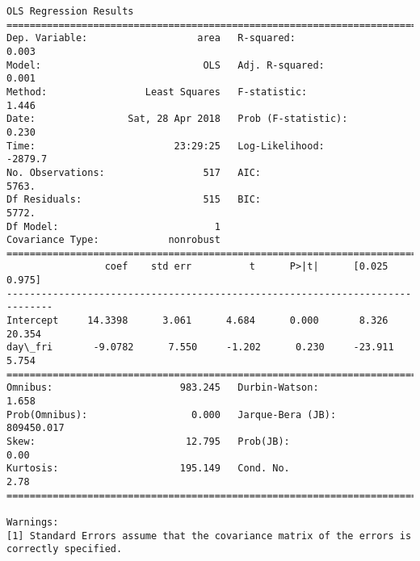 \documentclass[11pt]{article}
\begin{document}
\begin{Verbatim}[commandchars=\\\{\}]
                            OLS Regression Results                            
==============================================================================
Dep. Variable:                   area   R-squared:                       0.003
Model:                            OLS   Adj. R-squared:                  0.001
Method:                 Least Squares   F-statistic:                     1.446
Date:                Sat, 28 Apr 2018   Prob (F-statistic):              0.230
Time:                        23:29:25   Log-Likelihood:                -2879.7
No. Observations:                 517   AIC:                             5763.
Df Residuals:                     515   BIC:                             5772.
Df Model:                           1                                         
Covariance Type:            nonrobust                                         
==============================================================================
                 coef    std err          t      P>|t|      [0.025      0.975]
------------------------------------------------------------------------------
Intercept     14.3398      3.061      4.684      0.000       8.326      20.354
day\_fri       -9.0782      7.550     -1.202      0.230     -23.911       5.754
==============================================================================
Omnibus:                      983.245   Durbin-Watson:                   1.658
Prob(Omnibus):                  0.000   Jarque-Bera (JB):           809450.017
Skew:                          12.795   Prob(JB):                         0.00
Kurtosis:                     195.149   Cond. No.                         2.78
==============================================================================

Warnings:
[1] Standard Errors assume that the covariance matrix of the errors is correctly specified.



\end{Verbatim}
\end{document}
